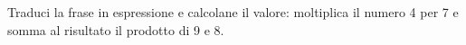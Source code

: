 \item Traduci la frase in espressione e calcolane il valore: moltiplica il numero 4 per 7 e somma al risultato il prodotto di 9 e 8.
